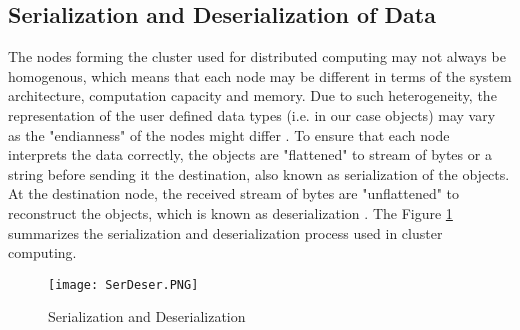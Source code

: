 \subsection{Serialization and Deserialization of Data}

The nodes forming the cluster used for distributed computing may not always be homogenous, which means that each node may be different in terms of the system architecture, computation capacity and memory. Due to such heterogeneity, the representation of the user defined data types (i.e. in our case objects) may vary as the "endianness" of the nodes might differ \cite{ObSerDeser}. To ensure that each node interprets the data correctly, the objects are "flattened" to stream of bytes or a string before sending it the destination, also known as serialization of the objects. At the destination node, the received stream of bytes are "unflattened" to reconstruct the objects, which is known as deserialization \cite{yadav2016system}. The Figure \ref{fig:SerDeser} summarizes the serialization and deserialization process used in cluster computing.

\begin{figure}[!t]
\centering
\texttt{[image: SerDeser.PNG]}
\caption{Serialization and Deserialization}
\label{fig:SerDeser}
\end{figure}
  